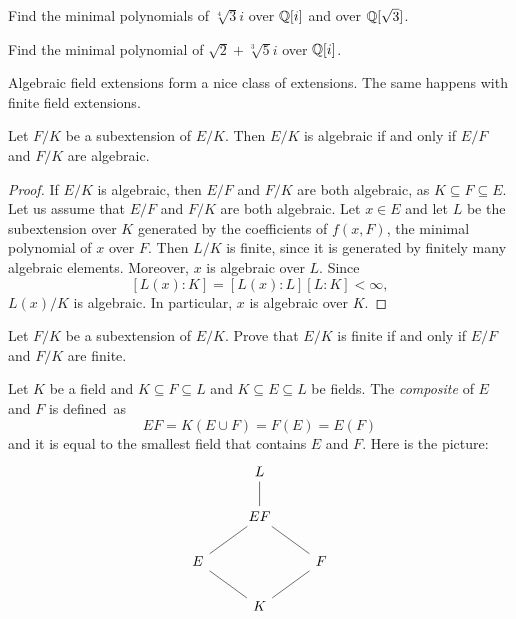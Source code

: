 \begin{exercise}
\label{xca:isqrt[4]3}
    Find the minimal polynomials of $\sqrt[4]{3}i$ over $\mathbb{Q}[i]$ and over $\mathbb{Q}[\sqrt{3}]$. 
\end{exercise}

\begin{exercise}
\label{xca:sqrt{2}+sqrt[3]{5}i}
    Find the minimal polynomial of $\sqrt{2}+\sqrt[3]{5}i$ over $\mathbb{Q}[i]$.
\end{exercise}

%
%
%
Algebraic field extensions form a nice class of extensions. The same happens
with finite field extensions. 

\begin{proposition}
	Let $F/K$ be a subextension of $E/K$. Then $E/K$ is algebraic 
	if and only if $E/F$ and $F/K$ are algebraic. 
\end{proposition}

\begin{proof}
    If $E/K$ is algebraic, then $E/F$ and $F/K$ are both algebraic, 
    as $K\subseteq F\subseteq E$. 
    Let us assume that $E/F$ and $F/K$ are both algebraic. Let $x\in E$ and 
    let $L$ be the subextension over $K$ generated by the coefficients of $f(x,F)$, 
    the minimal polynomial of $x$ over $F$. Then $L/K$ is finite, since it is generated
    by finitely many algebraic elements. Moreover, $x$ is algebraic over $L$. Since 
    \[
    [L(x):K]=[L(x):L][L:K]<\infty,
    \]
    $L(x)/K$ is algebraic. In particular, $x$ is algebraic over $K$. 
\end{proof}

\begin{exercise}
\label{xca:tower of finite extensions}
	Let $F/K$ be a subextension of $E/K$. Prove that $E/K$ is finite 
	if and only if $E/F$ and $F/K$ are finite. 
\end{exercise}

Let $K$ be a field and $K\subseteq 
F\subseteq L$ and $K\subseteq E\subseteq L$ be fields. The \emph{composite}  
of $E$ and $F$ is defined~as 
\[
EF=K(E\cup F)=F(E)=E(F)
\]
and it is equal to the 
smallest field that contains $E$ and $F$. Here is the
picture:
\[\begin{tikzcd}
	& L \\
	& EF \\
	E && F \\
	& K
	\arrow[no head, from=1-2, to=2-2]
	\arrow[no head, from=2-2, to=3-1]
	\arrow[no head, from=2-2, to=3-3]
	\arrow[no head, from=3-1, to=4-2]
	\arrow[no head, from=4-2, to=3-3]
\end{tikzcd}\]


